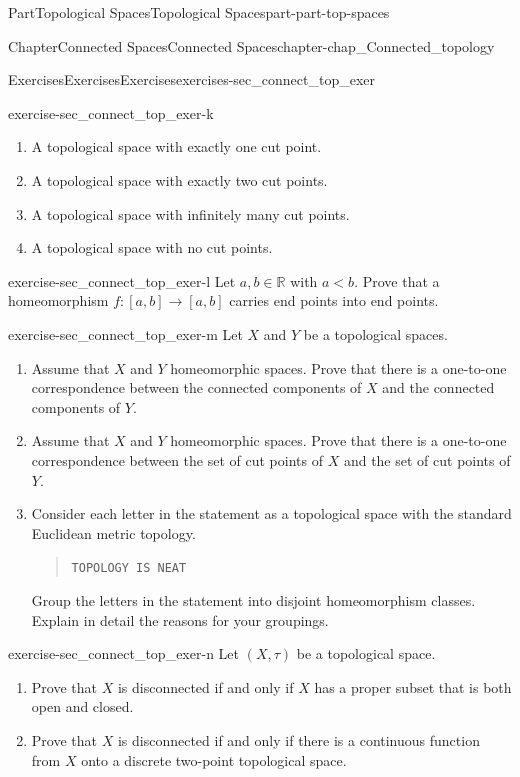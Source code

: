 \documentclass[oneside,10pt,]{book}
\newcommand{\mono}[1]{\texttt{#1}}
\numberwithin{equation}{chapter}
\newcommand{\R}{\mathbb{R}}
\newcommand{\lt}{<}
\begin{document}
\begin{partptx}{Part}{Topological Spaces}{}{Topological Spaces}{}{}{part-part-top-spaces}
\begin{chapterptx}{Chapter}{Connected Spaces}{}{Connected Spaces}{}{}{chapter-chap_Connected_topology}
\begin{exercises-section}{Exercises}{Exercises}{}{Exercises}{}{}{exercises-sec_connect_top_exer}
\begin{divisionexercise}{11}{}{}{exercise-sec_connect_top_exer-k}
\begin{enumerate}[font=\bfseries,label=(\alph*),ref=\alph*]
\item{}A topological space with exactly one cut point.%
\item{}A topological space with exactly two cut points.%
\item{}A topological space with infinitely many cut points.%
\item{}A topological space with no cut points.%
\end{enumerate}%
\end{divisionexercise}%
\begin{divisionexercise}{12}{}{}{exercise-sec_connect_top_exer-l}%
Let \(a, b \in \R\) with \(a \lt b\). Prove that a homeomorphism \(f: [a,b] \to [a,b]\) carries end points into end points.%
\end{divisionexercise}%
\begin{divisionexercise}{13}{}{}{exercise-sec_connect_top_exer-m}%
Let \(X\) and \(Y\) be a topological spaces.%
\begin{enumerate}[font=\bfseries,label=(\alph*),ref=\alph*]%
\item{}Assume that \(X\) and \(Y\) homeomorphic spaces. Prove that there is a one-to-one correspondence between the connected components of \(X\) and the connected components of \(Y\).%
\item{}Assume that \(X\) and \(Y\) homeomorphic spaces. Prove that there is a one-to-one correspondence between the set of cut points of \(X\) and the set of cut points of \(Y\).%
\item{}Consider each letter in the statement as a topological space with the standard Euclidean metric topology.%
\begin{quote}%
\mono{TOPOLOGY IS NEAT}%
\end{quote}
Group the letters in the statement into disjoint homeomorphism classes. Explain in detail the reasons for your groupings.%
\end{enumerate}%
\end{divisionexercise}%
\begin{divisionexercise}{14}{}{}{exercise-sec_connect_top_exer-n}%
Let \((X, \tau)\) be a topological space.%
\begin{enumerate}[font=\bfseries,label=(\alph*),ref=\alph*]%
\item{}Prove that \(X\) is disconnected if and only if \(X\) has a proper subset that is both open and closed.%
\item{}Prove that \(X\) is disconnected if and only if there is a continuous function from \(X\) onto a discrete two-point topological space.%

\end{enumerate}
\end{divisionexercise}
\end{exercises-section}
\end{chapterptx}
\end{partptx}
\end{document}
